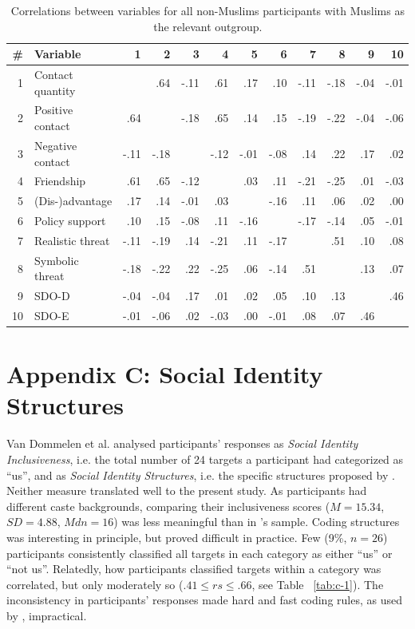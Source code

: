 \documentclass[12pt, a4paper]{article}
\begin{document}
\begin{table}[!hp]
\centering
{}
\caption{Correlations between variables for all non-Muslims participants with Muslims as the relevant outgroup.}
\small	
\begin{tabularx}{\linewidth}{r@{~~}X@{~~}rrrrrrrrrr} \toprule
\# & Variable & 1 & 2 & 3 & 4 & 5 & 6 & 7 & 8 & 9 & 10 \\ \midrule 
1 & Contact quantity &  &  .64 & -.11 &  .61 &  .17 &  .10 & -.11 & -.18 & -.04 & -.01 \\ 
  2 & Positive contact &  .64 &  & -.18 &  .65 &  .14 &  .15 & -.19 & -.22 & -.04 & -.06 \\ 
  3 & Negative contact & -.11 & -.18 &  & -.12 & -.01 & -.08 &  .14 &  .22 &  .17 &  .02 \\ 
  4 & Friendship &  .61 &  .65 & -.12 &  &  .03 &  .11 & -.21 & -.25 &  .01 & -.03 \\ 
  5 & (Dis-)advantage &  .17 &  .14 & -.01 &  .03 &  & -.16 &  .11 &  .06 &  .02 &  .00 \\ 
  6 & Policy support &  .10 &  .15 & -.08 &  .11 & -.16 &  & -.17 & -.14 &  .05 & -.01 \\ 
  7 & Realistic threat & -.11 & -.19 &  .14 & -.21 &  .11 & -.17 &  &  .51 &  .10 &  .08 \\ 
  8 & Symbolic threat & -.18 & -.22 &  .22 & -.25 &  .06 & -.14 &  .51 &  &  .13 &  .07 \\ 
  9 & SDO-D & -.04 & -.04 &  .17 &  .01 &  .02 &  .05 &  .10 &  .13 &  &  .46 \\ 
  10 & SDO-E & -.01 & -.06 &  .02 & -.03 &  .00 & -.01 &  .08 &  .07 &  .46 &  \\ 
\bottomrule
\end{tabularx}
\label{tab:b-5}
\end{table}

\newpage

\section{Appendix C: Social Identity Structures}

Van Dommelen et al. \citeyear{dommelen_construing_2015} analysed participants' responses as \emph{Social Identity Inclusiveness}, i.e. the total number of 24 targets a participant had categorized as ``us'', and as \emph{Social Identity Structures}, i.e. the specific structures proposed by . Neither measure translated well to the present study. As participants had different caste backgrounds, comparing their inclusiveness scores ($M = 15.34$, $\textit{SD} = 4.88$, $\textit{Mdn} = 16$) was less meaningful than in \citeauthor{dommelen_construing_2015}'s sample. Coding structures was interesting in principle, but proved difficult in practice.  Few (9\%, $n = 26$) participants consistently classified all targets in each category as either ``us'' or ``not us''. Relatedly, how participants classified targets within a category was correlated, but only moderately so ($.41 \leq rs \leq.66$, see Table ~\ref{tab:c-1}). The inconsistency in participants' responses made hard and fast coding rules, as used by \citeauthor{dommelen_construing_2015}, impractical.
\end{document}
